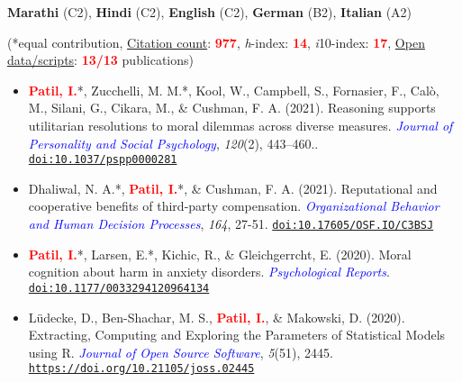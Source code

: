\documentclass[10pt]{article}
\begin{document}
	\textbf{Marathi} (C2), \textbf{Hindi} (C2), \textbf{English} (C2), \textbf{German} (B2), \textbf{Italian} (A2)
	

	\begin{center}
	(*equal contribution, \href{https://scholar.google.it/citations?user=kSYuYTUAAAAJ&hl=en&oi=ao}{Citation count}: \textbf{\textcolor{red}{977}}, \textit{h}-index: \textbf{\textcolor{red}{14}}, \textit{i}10-index: \textbf{\textcolor{red}{17}}, \href{https://osf.io/hk5f3/}{Open data/scripts}: \textbf{\textcolor{red}{13/13}} publications)
	\end{center}
	
	\begin{itemize}
	
	\item \textbf{\textcolor{red}{Patil, I.}}*, Zucchelli, M. M.*, Kool, W., Campbell, S., Fornasier, F., Cal\`{o}, M., Silani, G., Cikara, M., \& Cushman, F. A. (2021). Reasoning supports utilitarian resolutions to moral dilemmas across diverse measures. \textit{\textcolor{blue}{Journal of Personality and Social Psychology}}, \textit{120}(2), 443–460.. \href{https://www.researchgate.net/publication/338496843_Reasoning_supports_utilitarian_resolutions_to_moral_dilemmas_across_diverse_measures}{\tt doi:10.1037/pspp0000281}
	
	\item Dhaliwal, N. A.*, \textbf{\textcolor{red}{Patil, I.}}*, \& Cushman, F. A. (2021). Reputational and cooperative benefits of third-party compensation. \textit{\textcolor{blue}{Organizational Behavior and Human Decision Processes}}, \textit{164}, 27-51. \href{https://www.researchgate.net/publication/349073655_Reputational_and_cooperative_benefits_of_third-party_compensation}{\tt doi:10.17605/OSF.IO/C3BSJ}
	
	\item  \textbf{\textcolor{red}{Patil, I.}}*, Larsen, E.*, Kichic, R., \& Gleichgerrcht, E. (2020). Moral cognition about harm in anxiety  disorders. \textit{\textcolor{blue}{Psychological Reports}}. \href{https://psyarxiv.com/g5p7v/}{\tt doi:10.1177/0033294120964134}
	
    \item Lüdecke, D., Ben-Shachar,  M. S., \textbf{\textcolor{red}{Patil, I.}}, \& Makowski, D. (2020). Extracting, Computing and Exploring the Parameters of Statistical Models using R. \textit{\textcolor{blue}{Journal of Open Source Software}}, \textit{5}(51), 2445. \href{https://joss.theoj.org/papers/10.21105/joss.02445}{\tt https://doi.org/10.21105/joss.02445}
	

\end{itemize}
\end{document}
